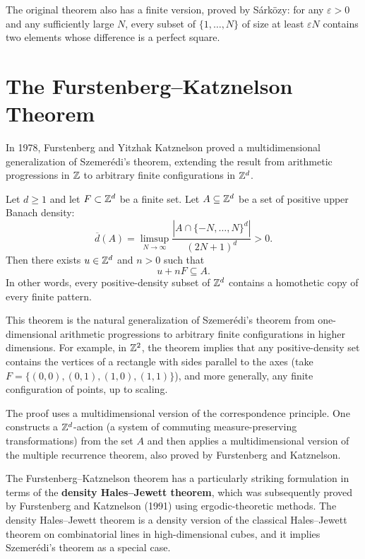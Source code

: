The original theorem also has a finite version, proved by S\'ark\"ozy: for any \(\varepsilon > 0\) and any sufficiently large \(N\), every subset of \(\{1,\dots,N\}\) of size at least \(\varepsilon N\) contains two elements whose difference is a perfect square.

\section{The Furstenberg--Katznelson Theorem}

In 1978, Furstenberg and Yitzhak Katznelson proved a multidimensional generalization of Szemer\'edi's theorem, extending the result from arithmetic progressions in \(\mathbb{Z}\) to arbitrary finite configurations in \(\mathbb{Z}^d\).

\begin{theorem}
Let \(d \geq 1\) and let \(F \subset \mathbb{Z}^d\) be a finite set. Let \(A \subseteq \mathbb{Z}^d\) be a set of positive upper Banach density:
\[
\overline{d}(A) = \limsup_{N \to \infty} \frac{|A \cap \{-N,\dots,N\}^d|}{(2N+1)^d} > 0.
\]
Then there exists \(u \in \mathbb{Z}^d\) and \(n > 0\) such that
\[
u + nF \subseteq A.
\]
In other words, every positive-density subset of \(\mathbb{Z}^d\) contains a homothetic copy of every finite pattern.
\end{theorem}

This theorem is the natural generalization of Szemer\'edi's theorem from one-dimensional arithmetic progressions to arbitrary finite configurations in higher dimensions. For example, in \(\mathbb{Z}^2\), the theorem implies that any positive-density set contains the vertices of a rectangle with sides parallel to the axes (take \(F = \{(0,0), (0,1), (1,0), (1,1)\}\)), and more generally, any finite configuration of points, up to scaling.

The proof uses a multidimensional version of the correspondence principle. One constructs a \(\mathbb{Z}^d\)-action (a system of commuting measure-preserving transformations) from the set \(A\) and then applies a multidimensional version of the multiple recurrence theorem, also proved by Furstenberg and Katznelson.

The Furstenberg--Katznelson theorem has a particularly striking formulation in terms of the \textbf{density Hales--Jewett theorem}, which was subsequently proved by Furstenberg and Katznelson (1991) using ergodic-theoretic methods. The density Hales--Jewett theorem is a density version of the classical Hales--Jewett theorem on combinatorial lines in high-dimensional cubes, and it implies Szemer\'edi's theorem as a special case.

